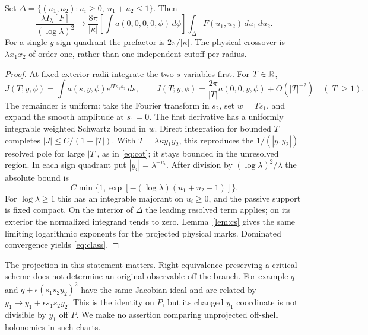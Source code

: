 \begin{proposition}\label{prop:classicalmark}
Set \(\Delta=\{(u_1,u_2):u_i\ge0,\ u_1+u_2\le1\}\). Then
\begin{equation}\label{eq:class}
 \frac{\lambda I_\lambda[F]}{(\log\lambda)^2}
 \longrightarrow
 \frac{8\pi}{|\kappa|}
  \left[\int a(0,0,0,0,\phi)\,d\phi\right]
  \int_\Delta F(u_1,u_2)\,du_1\,du_2 .
\end{equation}
For a single \(y\)-sign quadrant the prefactor is \(2\pi/|\kappa|\). The physical crossover is \(\lambda x_1x_2\) of order one, rather than one independent cutoff per radius.
\end{proposition}
\begin{proof}
At fixed exterior radii integrate the two \(s\) variables first. For \(T\in\mathbb R\),
\[
 J(T;y,\phi)=\int a(s,y,\phi)e^{\ii T s_1s_2}\,ds,\qquad
 J(T;y,\phi)=\frac{2\pi}{|T|}a(0,0,y,\phi)+O(|T|^{-2})
 \quad (|T|\ge1).
\]
The remainder is uniform: take the Fourier transform in \(s_2\), set \(w=Ts_1\), and expand the smooth amplitude at \(s_1=0\). The first derivative has a uniformly integrable weighted Schwartz bound in \(w\). Direct integration for bounded \(T\) completes \(|J|\le C/(1+|T|)\). With \(T=\lambda\kappa y_1y_2\), this reproduces the \(1/(|y_1y_2|)\) resolved pole for large \(|T|\), as in \eqref{eq:cot}; it stays bounded in the unresolved region. In each sign quadrant put \(|y_i|=\lambda^{-u_i}\). After division by \((\log\lambda)^2/\lambda\) the absolute bound is
\[
 C\min\{1,\exp[-(\log\lambda)(u_1+u_2-1)]\}.
\]
For \(\log\lambda\ge1\) this has an integrable majorant on \(u_i\ge0\), and the passive support is fixed compact. On the interior of \(\Delta\) the leading resolved term applies; on its exterior the normalized integrand tends to zero. Lemma~\ref{lem:cs} gives the same limiting logarithmic exponents for the projected physical marks. Dominated convergence yields \eqref{eq:class}.
\end{proof}

The projection in this statement matters. Right equivalence preserving a critical scheme does not determine an original observable off the branch. For example \(q\) and \(q+\epsilon(s_1s_2y_2)^2\) have the same Jacobian ideal and are related by \(y_1\mapsto y_1+\epsilon s_1s_2y_2\). This is the identity on \(P\), but its changed \(y_1\) coordinate is not divisible by \(y_1\) off \(P\). We make no assertion comparing unprojected off-shell holonomies in such charts.

